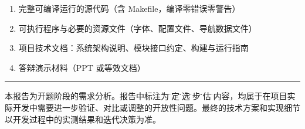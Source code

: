 \documentclass[12pt,a4paper]{ctexart}
\begin{document}

\begin{enumerate}[leftmargin=*]
    \item 完整可编译运行的源代码（含 Makefile，编译零错误零警告）
    \item 可执行程序与必要的资源文件（字体、配置文件、导航数据文件）
    \item 项目技术文档：系统架构说明、模块接口约定、构建与运行指南
    \item 答辩演示材料（PPT 或等效文档）
\end{enumerate}

\vspace{1cm}

\begin{center}
\rule{0.4\textwidth}{0.4pt}

{\small 本报告为开题阶段的需求分析。报告中标注为\"待定\"\"候选\"\"初步\"\"预估\"的内容，均属于在项目实际开发中需要进一步验证、对比或调整的开放性问题。最终的技术方案和实现细节以开发过程中的实测结果和迭代决策为准。}
\end{center}
\end{document}
